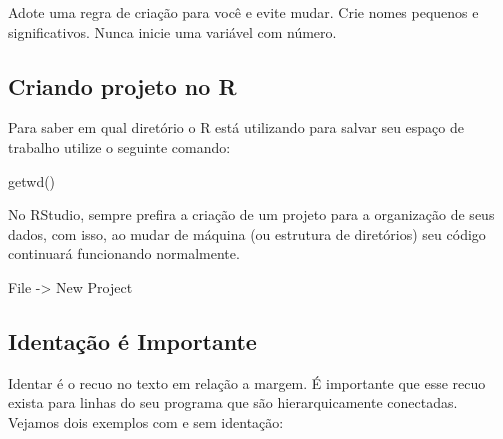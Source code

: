 \documentclass[
  letterpaper,
  DIV=11,
  numbers=noendperiod]{scrreprt}
\newenvironment{Shaded}{\begin{snugshade}}{\end{snugshade}}
\newcommand{\FunctionTok}[1]{\textcolor[rgb]{0.28,0.35,0.67}{#1}}
\newcommand{\NormalTok}[1]{\textcolor[rgb]{0.00,0.23,0.31}{#1}}
\newcommand{\OtherTok}[1]{\textcolor[rgb]{0.00,0.23,0.31}{#1}}
\begin{document}
\begin{tcolorbox}[enhanced jigsaw, leftrule=.75mm, coltitle=black, colframe=quarto-callout-tip-color-frame, toprule=.15mm, opacitybacktitle=0.6, bottomtitle=1mm, bottomrule=.15mm, titlerule=0mm, toptitle=1mm, title=\textcolor{quarto-callout-tip-color}{\faLightbulb}\hspace{0.5em}{DICA}, arc=.35mm, breakable, opacityback=0, colbacktitle=quarto-callout-tip-color!10!white, colback=white, left=2mm, rightrule=.15mm]

Adote uma regra de criação para você e evite mudar. Crie nomes pequenos
e significativos. Nunca inicie uma variável com número.

\end{tcolorbox}

\subsection{Criando projeto no R}\label{criando-projeto-no-r}

Para saber em qual diretório o R está utilizando para salvar seu espaço
de trabalho utilize o seguinte comando:

\begin{Shaded}
\begin{Highlighting}[]
\FunctionTok{getwd}\NormalTok{() }
\end{Highlighting}
\end{Shaded}

No RStudio, sempre prefira a criação de um projeto para a organização de
seus dados, com isso, ao mudar de máquina (ou estrutura de diretórios)
seu código continuará funcionando normalmente.

\begin{Shaded}
\begin{Highlighting}[]
\NormalTok{  File }\OtherTok{{-}\textgreater{}}\NormalTok{ New Project}
\end{Highlighting}
\end{Shaded}

\subsection{Identação é
Importante}\label{identauxe7uxe3o-uxe9-importante}

Identar é o recuo no texto em relação a margem. É importante que esse
recuo exista para linhas do seu programa que são hierarquicamente
conectadas. Vejamos dois exemplos com e sem identação:
\end{document}

